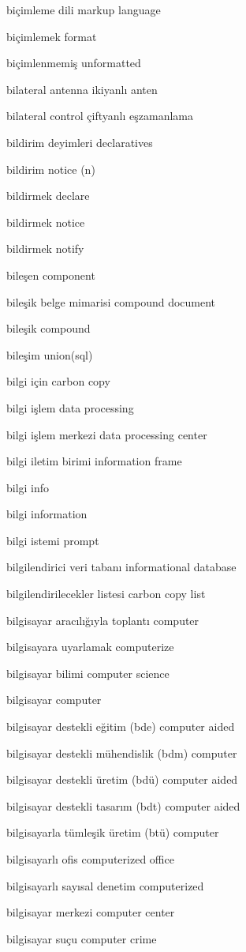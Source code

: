 \documentclass[12pt,fleqn]{article}\usepackage{../../common}
\begin{document}
biçimleme dili markup language

biçimlemek format

biçimlenmemiş unformatted

bilateral antenna ikiyanlı anten

bilateral control çiftyanlı eşzamanlama

bildirim deyimleri declaratives

bildirim notice (n)

bildirmek declare

bildirmek notice

bildirmek notify

bileşen component

bileşik belge mimarisi compound document

bileşik compound

bileşim union(sql)

bilgi için carbon copy

bilgi işlem data processing

bilgi işlem merkezi data processing center

bilgi iletim birimi information frame

bilgi info

bilgi information

bilgi istemi prompt

bilgilendirici veri tabanı informational database

bilgilendirilecekler listesi carbon copy list

bilgisayar aracılığıyla toplantı computer

bilgisayara uyarlamak computerize

bilgisayar bilimi computer science

bilgisayar computer

bilgisayar destekli eğitim (bde) computer aided

bilgisayar destekli mühendislik (bdm) computer

bilgisayar destekli üretim (bdü) computer aided

bilgisayar destekli tasarım (bdt) computer aided

bilgisayarla tümleşik üretim (btü) computer

bilgisayarlı ofis computerized office

bilgisayarlı sayısal denetim computerized

bilgisayar merkezi computer center

bilgisayar suçu computer crime
\end{document}

